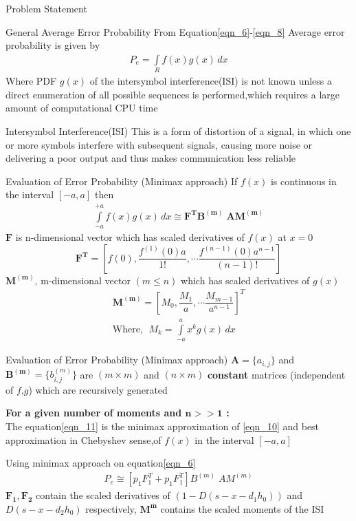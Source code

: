 \documentclass{beamer}
\providecommand{\mbf}{\boldsymbol}
\providecommand{\sbrak}[1]{\ensuremath{{}\left[#1\right]}}
\providecommand{\brak}[1]{\ensuremath{\left(#1\right)}}
\newcommand{\Int}{\int\limits}
\begin{document}
\begin{frame}{Problem Statement}
\begin{block}{General Average Error Probability}
From Equation\eqref{eqn_6}-\eqref{eqn_8} Average error probability is given by
\begin{align}
P_{e} = \Int_{R} f(x)g(x)\,dx \label{eqn_10}
\end{align}
Where PDF $g(x)$ of the intersymbol interference(ISI) is not known unless a direct enumeration of all possible sequences is 
performed,which requires a large amount of computational CPU time
\end{block}
\begin{block}{Intersymbol Interference(ISI)}
This is a form of distortion of a signal, in which one or more symbols interfere with subsequent signals, causing more noise or
delivering a poor output and thus makes communication less reliable
\end{block}
\end{frame}
\begin{frame}{Evaluation of Error Probability (Minimax approach)}
If $f(x)$ is continuous in the interval $\sbrak{-a,a}$ then 
\begin{align}
\Int_{-a}^{+a} f(x)g(x)\,dx \cong \mbf{F^{T} B^{(m)}\;A M^{(m)}} \label{eqn_11}
\end{align}
$\mbf{F}$ is n-dimensional vector which has scaled derivatives of $f(x)$ at $x=0$
\begin{equation}
\mbf{F^{T}} = \sbrak{f(0),\dfrac{f^{(1)}(0)a}{1!},\cdots \dfrac{f^{(n-1)}(0)a^{n-1}}{(n-1)!}}
\end{equation}
$\mbf{M^{(m)}}$, m-dimensional vector $(m\leq n)$ which has scaled derivatives of $g(x)$
\begin{align}
\mathbf{M^{(m)}} = \sbrak{M_{0},\dfrac{M_{1}}{a},\cdots\dfrac{M_{m-1}}{a^{n-1}}}^{T} \\
\text{Where, }\; M_{k} = \Int_{-a}^{a} x^{k}g(x)\,dx
\end{align}
\end{frame}
\begin{frame}{Evaluation of Error Probability (Minimax approach)}
$\mbf{A}=\{a_{i,j}\}$ and $\mbf{B^{(m)}}=\{b_{i,j}^{(m)}\}$ are $(m \times m)$ and $(n \times m)$
\textbf{constant} matrices (independent of $f$,$g$) which are recursively generated 
\null \par \null
\textbf{For a given number of moments and $\mbf{n>>1}$ :} \\
The equation\eqref{eqn_11} is the minimax approximation of \eqref{eqn_10}
and best approximation in Chebyshev sense,of $f(x)$ in the interval $\sbrak{-a,a}$ 
\null \par \null
\begin{block}{Using minimax approach on equation\eqref{eqn_6}}
\begin{align}
P_{e} \cong \sbrak{p_{1}F_{1}^{T} + p_{1}F_{1}^{T}}B^{(m)}\;A M^{(m)} \label{eqn_15}
\end{align}
$\mbf{F_{1},F_{2}}$ contain the scaled derivatives of $\brak{1-D(s-x-d_{1}h_{0})}$ and $D(s-x-d_{2}h_{0})$ 
respectively, $\mbf{M^{m}}$ contains the scaled moments of the ISI
\end{block}
\end{frame}
\end{document}
